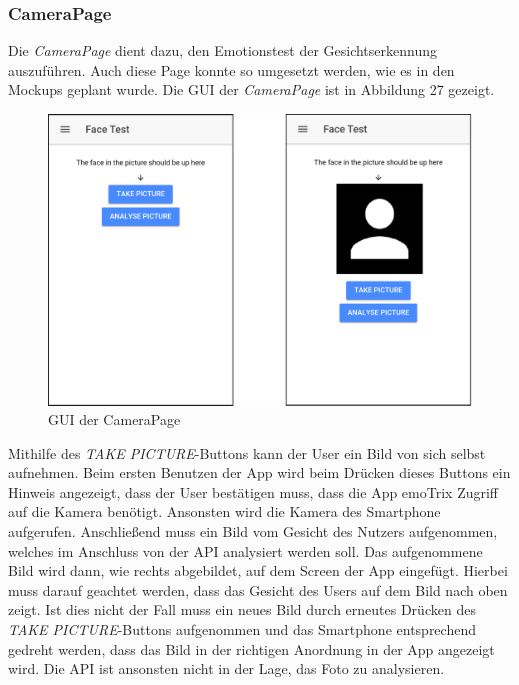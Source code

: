 \subsubsection{CameraPage}
Die \textit{CameraPage} dient dazu, den Emotionstest der Gesichtserkennung auszuführen. Auch diese Page konnte so umgesetzt werden, wie es in den Mockups geplant wurde. Die GUI der \textit{CameraPage} ist in Abbildung 27 gezeigt. \newline
\begin{figure}[h]
	\centering
	\includegraphics[width=13.5cm]{Bilder/camerapage.png}
	\caption[GUI der CameraPage]{GUI der CameraPage}
\end{figure}%
\newline
Mithilfe des \textit{TAKE PICTURE}-Buttons kann der User ein Bild von sich selbst aufnehmen. Beim ersten Benutzen der App wird beim Drücken dieses Buttons ein Hinweis angezeigt, dass der User bestätigen muss, dass die App emoTrix Zugriff auf die Kamera benötigt. Ansonsten wird die Kamera des Smartphone aufgerufen. Anschließend muss ein Bild vom Gesicht des Nutzers aufgenommen, welches im Anschluss von der API analysiert werden soll. Das aufgenommene Bild wird dann, wie rechts abgebildet, auf dem Screen der App eingefügt. Hierbei muss darauf geachtet werden, dass das Gesicht des Users auf dem Bild nach oben zeigt. Ist dies nicht der Fall muss ein neues Bild durch erneutes Drücken des \textit{TAKE PICTURE}-Buttons aufgenommen und das Smartphone entsprechend gedreht werden, dass das Bild in der richtigen Anordnung in der App angezeigt wird. Die API ist ansonsten nicht in der Lage, das Foto zu analysieren. \newline
